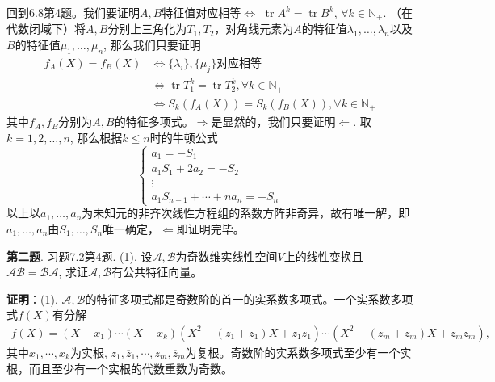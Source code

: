 回到6.8第4题。我们要证明$A, B$特征值对应相等$\Longleftrightarrow$ $\operatorname{tr} A^k = \operatorname{tr} B^k$, $\forall k \in \mathbb{N}_+$. （在代数闭域下）将$A,B$分别上三角化为$T_1, T_2$，对角线元素为$A$的特征值$\lambda_1,\ldots,\lambda_n$以及$B$的特征值$\mu_1,\ldots,\mu_n$, 那么我们只要证明
\begin{align*}
f_A(X) = f_B(X) & \Longleftrightarrow \{\lambda_i\}, \{\mu_j\}\text{对应相等} \\
& \Longleftrightarrow \operatorname{tr} T_1^k = \operatorname{tr} T_2^k, \forall k \in \mathbb{N}_+ \\
& \Longleftrightarrow S_k(f_A(X)) = S_k(f_B(X)), \forall k \in \mathbb{N}_+
\end{align*}
其中$f_A, f_B$分别为$A,B$的特征多项式。$\Longrightarrow$是显然的，我们只要证明$\Longleftarrow$. 取$k = 1, 2, \ldots, n$, 那么根据$k \leqslant n$时的牛顿公式
$$
\begin{cases}
a_1 = -S_1 \\
a_1S_1 + 2a_2 = -S_2 \\
\vdots \\
a_1S_{n-1} + \cdots + na_n = -S_n
\end{cases}
$$
以上以$a_1,\ldots,a_n$为未知元的非齐次线性方程组的系数方阵非奇异，故有唯一解，即$a_1,\ldots,a_n$由$S_1,\ldots,S_n$唯一确定，$\Longleftarrow$即证明完毕。


\newpageorvspace


{\bf 第二题}. 习题7.2第4题. (1). 设$\mathscr{A,B}$为奇数维实线性空间$V$上的线性变换且$\mathscr{AB} = \mathscr{BA}$, 求证$\mathscr{A,B}$有公共特征向量。


{\bf 证明}：(1). $\mathscr{A,B}$的特征多项式都是奇数阶的首一的实系数多项式。一个实系数多项式$f(X)$有分解
\begin{multline*}
f(X) = (X-x_1) \cdots (X-x_k) (X^2 - (z_1+\overline{z}_1)X + z_1\overline{z}_1) \cdots (X^2 - (z_m+\overline{z}_m)X + z_m\overline{z}_m),
\end{multline*}
其中$x_1, \cdots, x_k$为实根, $z_1, \overline{z}_1, \cdots, z_m, \overline{z}_m$为复根。奇数阶的实系数多项式至少有一个实根，而且至少有一个实根的代数重数为奇数。

